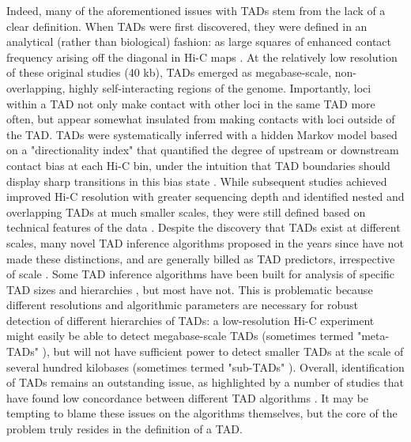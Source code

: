 Indeed, many of the aforementioned issues with TADs stem from the lack of a clear definition. When TADs were first discovered, they were defined in an analytical (rather than biological) fashion: as large squares of enhanced contact frequency arising off the diagonal in Hi-C maps \cite{Dixon.2012, Nora.2012, Hou.2012, Sexton.2012}. At the relatively low resolution of these original studies (40 kb), TADs emerged as megabase-scale, non-overlapping, highly self-interacting regions of the genome. Importantly, loci within a TAD not only make contact with other loci in the same TAD more often, but appear somewhat insulated from making contacts with loci outside of the TAD. TADs were systematically inferred with a hidden Markov model based on a "directionality index" that quantified the degree of upstream or downstream contact bias at each Hi-C bin, under the intuition that TAD boundaries should display sharp transitions in this bias state \cite{Dixon.2012}. While subsequent studies achieved improved Hi-C resolution with greater sequencing depth and identified nested and overlapping TADs at much smaller scales, they were still defined based on technical features of the data \cite{Rao.2014}. Despite the discovery that TADs exist at different scales, many novel TAD inference algorithms proposed in the years since have not made these distinctions, and are generally billed as TAD predictors, irrespective of scale \cite{Dali.2017}. Some TAD inference algorithms have been built for analysis of specific TAD sizes and hierarchies \cite{Rao.2014, Weinreb.2016}, but most have not. This is problematic because different resolutions and algorithmic parameters are necessary for robust detection of different hierarchies of TADs: a low-resolution Hi-C experiment might easily be able to detect megabase-scale TADs (sometimes termed "meta-TADs" \cite{Fraser.2015ygb}), but will not have sufficient power to detect smaller TADs at the scale of several hundred kilobases (sometimes termed "sub-TADs" \cite{Phillips-Cremins.2013}). Overall, identification of TADs remains an outstanding issue, as highlighted by a number of studies that have found low concordance between different TAD algorithms \cite{Dali.2017, Zufferey.2018, Forcato.2017}. It may be tempting to blame these issues on the algorithms themselves, but the core of the problem truly resides in the definition of a TAD.

